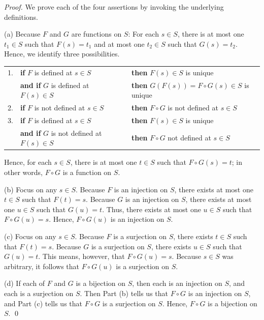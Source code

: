 \begin{proof}
We prove each of the four assertions by invoking the underlying
definitions.

\noindent (a)
%
Because $F$ and $G$ are functions on $S$: For each $s \in S$, there is
at most one $t_1 \in S$ such that $F(s) = t_1$ and at most one $t_2
\in S$ such that $G(s) = t_2$.  Hence, we identify three
possibilities.

\smallskip

\begin{tabular}{lllll}
1. &
{\bf if}
$F$ is defined at $s \in S$  & & & {\bf then} $F(s) \in S$ is unique \\
  &
{\bf and if} $G$ is defined at $F(s) \in S$ & & & {\bf then} $G(F(s))
= F \circ G(s) \in S$ is unique \\
2. &
{\bf if}
$F$ is not defined at $s \in S$ & & & {\bf then} $F \circ G$ is not
defined at $s \in S$ \\
3. & 
{\bf if}
$F$ is defined at $s \in S$ & & & {\bf then} $F(s) \in S$ is unique \\
  &
{\bf and if} $G$ is not defined at $F(s) \in S$ & & & {\bf then}
$F \circ G$ not defined at $s \in S$ %
\end{tabular}

\smallskip

\noindent
Hence, for each $s \in S$, there is at most one $t \in S$ such that $F
\circ G(s) = t$; in other words, $F \circ G$ is a function on $S$.

\medskip

\noindent (b)
%
Focus on any $s \in S$.  Because $F$ is an injection on $S$, there
exists at most one $t \in S$ such that $F(t) = s$.  Because $G$ is an
injection on $S$, there exists at most one $u \in S$ such that $G(u) =
t$.  Thus, there exists at most one $u \in S$ such that $F \circ G(u)
= s$.  Hence, $F \circ G(u)$ is an injection on $S$.

\medskip

\noindent (c)
%
Focus on any $s \in S$.  Because $F$ is a surjection on $S$, there
exists $t \in S$ such that $F(t) = s$.  Because $G$ is a surjection on
$S$, there exists $u \in S$ such that $G(u) = t$.  This means,
however, that $F \circ G(u) = s$.  Because $s \in S$ was arbitrary, it
follows that $F \circ G(u)$ is a surjection on $S$.

\medskip

\noindent (d)
%
If each of $F$ and $G$ is a bijection on $S$, then each is an
injection on $S$, and each is a surjection on $S$.  Then Part (b)
tells us that $F \circ G$ is an injection on $S$, and Part (c) tells
us that $F \circ G$ is a surjection on $S$.  Hence, $F \circ G$ is a
bijection on $S$.  \qed
\end{proof}



